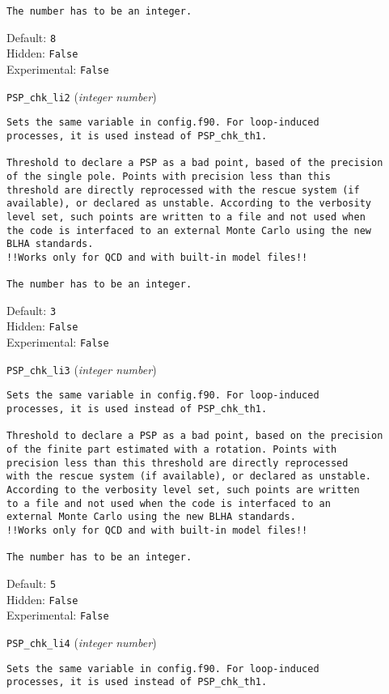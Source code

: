 \begin{basedescript}{\desclabelstyle{\pushlabel}}
\begin{verbatim}
The number has to be an integer.
\end{verbatim}
Default: \verb|8|
\\Hidden: \verb|False|
\\Experimental: \verb|False|
\\\item[\colorbox{gray!30}{\texttt{PSP\_chk\_li2}}] (\textit{integer number})
\begin{verbatim}
Sets the same variable in config.f90. For loop-induced
processes, it is used instead of PSP_chk_th1.

Threshold to declare a PSP as a bad point, based of the precision
of the single pole. Points with precision less than this
threshold are directly reprocessed with the rescue system (if
available), or declared as unstable. According to the verbosity
level set, such points are written to a file and not used when
the code is interfaced to an external Monte Carlo using the new
BLHA standards.
!!Works only for QCD and with built-in model files!!

The number has to be an integer.
\end{verbatim}
Default: \verb|3|
\\Hidden: \verb|False|
\\Experimental: \verb|False|
\\\item[\colorbox{gray!30}{\texttt{PSP\_chk\_li3}}] (\textit{integer number})
\begin{verbatim}
Sets the same variable in config.f90. For loop-induced
processes, it is used instead of PSP_chk_th1.

Threshold to declare a PSP as a bad point, based on the precision
of the finite part estimated with a rotation. Points with
precision less than this threshold are directly reprocessed
with the rescue system (if available), or declared as unstable.
According to the verbosity level set, such points are written
to a file and not used when the code is interfaced to an
external Monte Carlo using the new BLHA standards.
!!Works only for QCD and with built-in model files!!

The number has to be an integer.
\end{verbatim}
Default: \verb|5|
\\Hidden: \verb|False|
\\Experimental: \verb|False|
\\\item[\colorbox{gray!30}{\texttt{PSP\_chk\_li4}}] (\textit{integer number})
\begin{verbatim}
Sets the same variable in config.f90. For loop-induced
processes, it is used instead of PSP_chk_th1.


\end{verbatim}
\end{basedescript}
